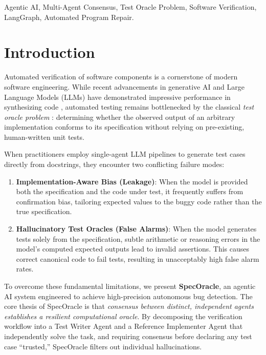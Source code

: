 \documentclass[conference]{IEEEtran}
\begin{document}
\begin{IEEEkeywords}
Agentic AI, Multi-Agent Consensus, Test Oracle Problem, Software Verification, LangGraph, Automated Program Repair.
\end{IEEEkeywords}

\section{Introduction}
Automated verification of software components is a cornerstone of modern software engineering. While recent advancements in generative AI and Large Language Models (LLMs) have demonstrated impressive performance in synthesizing code \cite{chen2021evaluating, roziere2023code}, automated testing remains bottlenecked by the classical \textit{test oracle problem} \cite{barr2014oracle}: determining whether the observed output of an arbitrary implementation conforms to its specification without relying on pre-existing, human-written unit tests.

When practitioners employ single-agent LLM pipelines to generate test cases directly from docstrings, they encounter two conflicting failure modes:
\begin{enumerate}
    \item \textbf{Implementation-Aware Bias (Leakage)}: When the model is provided both the specification and the code under test, it frequently suffers from confirmation bias, tailoring expected values to the buggy code rather than the true specification.
    \item \textbf{Hallucinatory Test Oracles (False Alarms)}: When the model generates tests solely from the specification, subtle arithmetic or reasoning errors in the model's computed expected outputs lead to invalid assertions. This causes correct canonical code to fail tests, resulting in unacceptably high false alarm rates.
\end{enumerate}

To overcome these fundamental limitations, we present \textbf{SpecOracle}, an agentic AI system engineered to achieve high-precision autonomous bug detection. The core thesis of SpecOracle is that \textit{consensus between distinct, independent agents establishes a resilient computational oracle}. By decomposing the verification workflow into a Test Writer Agent and a Reference Implementer Agent that independently solve the task, and requiring consensus before declaring any test case ``trusted,'' SpecOracle filters out individual hallucinations.
\end{document}
